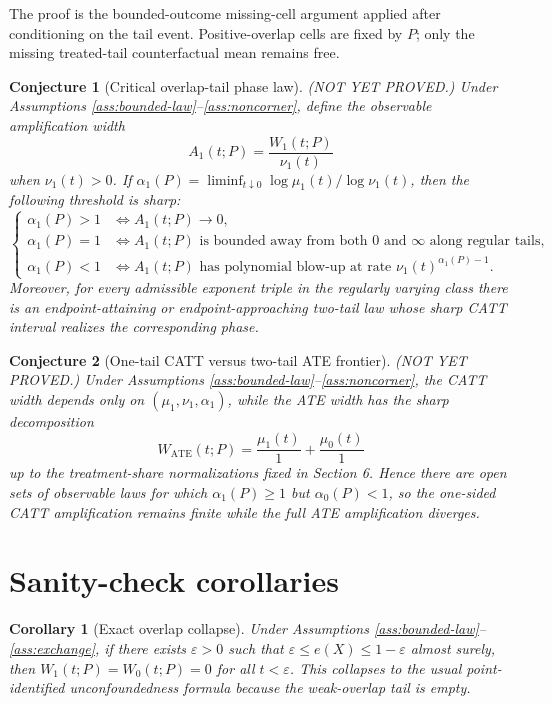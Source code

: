 \documentclass[11pt]{article}
\theoremstyle{definition}
\theoremstyle{plain}
\newtheorem{conjecture}{Conjecture}
\newtheorem{corollary}{Corollary}
\theoremstyle{remark}
\begin{document}
The proof is the bounded-outcome missing-cell argument applied after conditioning on the tail event.  Positive-overlap cells are fixed by \(P\); only the missing treated-tail counterfactual mean remains free.

\begin{conjecture}[Critical overlap-tail phase law]\label{conj:phase}
(NOT YET PROVED.)  Under Assumptions \ref{ass:bounded-law}--\ref{ass:noncorner}, define the observable amplification width
\[
A_1(t;P)=\frac{W_1(t;P)}{\nu_1(t)}
\]
when \(\nu_1(t)>0\).  If \(\alpha_1(P)=\liminf_{t\downarrow0}\log\mu_1(t)/\log\nu_1(t)\), then the following threshold is sharp:
\[
\begin{cases}
\alpha_1(P)>1 &\Longleftrightarrow A_1(t;P)\to 0,\\
\alpha_1(P)=1 &\Longleftrightarrow A_1(t;P)\text{ is bounded away from both }0\text{ and }\infty\text{ along regular tails},\\
\alpha_1(P)<1 &\Longleftrightarrow A_1(t;P)\text{ has polynomial blow-up at rate }\nu_1(t)^{\alpha_1(P)-1}.
\end{cases}
\]
Moreover, for every admissible exponent triple in the regularly varying class there is an endpoint-attaining or endpoint-approaching two-tail law whose sharp CATT interval realizes the corresponding phase.
\end{conjecture}

\begin{conjecture}[One-tail CATT versus two-tail ATE frontier]\label{conj:one-two}
(NOT YET PROVED.)  Under Assumptions \ref{ass:bounded-law}--\ref{ass:noncorner}, the CATT width depends only on \((\mu_1,\nu_1,\alpha_1)\), while the ATE width has the sharp decomposition
\[
W_{\mathrm{ATE}}(t;P)=\frac{\mu_1(t)}{1}+\frac{\mu_0(t)}{1}
\]
up to the treatment-share normalizations fixed in Section 6.  Hence there are open sets of observable laws for which \(\alpha_1(P)\ge1\) but \(\alpha_0(P)<1\), so the one-sided CATT amplification remains finite while the full ATE amplification diverges.
\end{conjecture}

\section{Sanity-check corollaries}
\begin{corollary}[Exact overlap collapse]\label{cor:overlap-collapse}
Under Assumptions \ref{ass:bounded-law}--\ref{ass:exchange}, if there exists \(\varepsilon>0\) such that \(\varepsilon\le e(X)\le1-\varepsilon\) almost surely, then \(W_1(t;P)=W_0(t;P)=0\) for all \(t<\varepsilon\).  This collapses to the usual point-identified unconfoundedness formula because the weak-overlap tail is empty.
\end{corollary}
\end{document}
